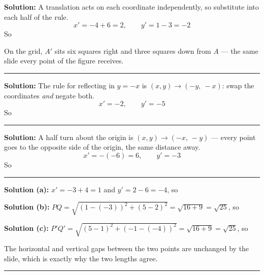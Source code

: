\documentclass[12pt]{article}
\begin{document}




\textbf{Solution:} A translation acts on each coordinate independently, so substitute into each half of the rule.
\[ x' = -4 + 6 = 2, \qquad y' = 1 - 3 = -2 \]
So 

On the grid, $A'$ sits six squares right and three squares down from $A$ --- the same slide every point of the figure receives.

\vspace{0.2cm}\noindent\rule{\linewidth}{0.2pt}


\textbf{Solution:} The rule for reflecting in $y = -x$ is $(x, y) \to (-y,\ -x)$: swap the coordinates \emph{and} negate both.
\[ x' = -2, \qquad y' = -5 \]
So 

\vspace{0.2cm}\noindent\rule{\linewidth}{0.2pt}


\textbf{Solution:} A half turn about the origin is $(x, y) \to (-x,\ -y)$ --- every point goes to the opposite side of the origin, the same distance away.
\[ x' = -(-6) = 6, \qquad y' = -3 \]
So 

\vspace{0.2cm}\noindent\rule{\linewidth}{0.2pt}


\textbf{Solution (a):} $x' = -3 + 4 = 1$ and $y' = 2 - 6 = -4$, so 

\textbf{Solution (b):} $PQ = \sqrt{(1-(-3))^2 + (5-2)^2} = \sqrt{16 + 9} = \sqrt{25}$, so 

\textbf{Solution (c):} $P'Q' = \sqrt{(5-1)^2 + (-1-(-4))^2} = \sqrt{16 + 9} = \sqrt{25}$, so 

The horizontal and vertical gaps between the two points are unchanged by the slide, which is exactly why the two lengths agree.

\vspace{0.2cm}\noindent\rule{\linewidth}{0.2pt}

\end{document}
